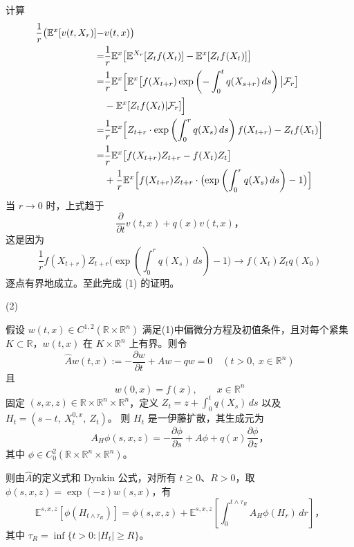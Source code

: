 \documentclass[UTF8，12pt]{ctexart}
\numberwithin{equation}{section}
\begin{document}
计算
\[
\begin{aligned}
	\frac{1}{r} \bigl( \mathbb{E}^x[v(t, X_r)] -& v(t, x) \bigr) \\
	=& \frac{1}{r} \mathbb{E}^x \bigl[ \mathbb{E}^{X_r}[Z_t f(X_t)] - \mathbb{E}^x[Z_t f(X_t)] \bigr]\\
													   =& \frac{1}{r} \mathbb{E}^x \Bigl[ \mathbb{E}^x \bigl[ f(X_{t+r}) \exp\left( -\int_0^t q(X_{s+r})\, ds \right) \big|\mathcal{F}_r \bigr]\\ 
													   &- \mathbb{E}^x[Z_t f(X_t)|\mathcal{F}_r] \Bigr]\\
													   =& \frac{1}{r} \mathbb{E}^x \Bigl[ Z_{t+r} \cdot \exp\left( \int_0^r q(X_s)\, ds \right) f(X_{t+r}) - Z_t f(X_t) \Bigr]\\
													   =&\frac{1}{r} \mathbb{E}^x \bigl[ f(X_{t+r}) Z_{t+r} - f(X_t) Z_t \bigr]\\
													   &+ \frac{1}{r} \mathbb{E}^x \Bigl[ f(X_{t+r}) Z_{t+r} \cdot \bigl( \exp\left( \int_0^r q(X_s)\, ds \right) - 1 \bigr) \Bigr]\\			   
\end{aligned}
\]
当 \( r \to 0 \) 时，上式趋于
\[
\frac{\partial}{\partial t} v(t, x) + q(x) v(t, x)，
\]
这是因为
\[
\frac{1}{r} f(X_{t+r}) Z_{t+r} \bigl( \exp\left( \int_0^r q(X_s)\, ds \right) - 1 \bigr) 
\to f(X_t) Z_t q(X_0)
\]
逐点有界地成立。至此完成 (1) 的证明。

\vspace{1.5em}   %

\noindent(2)

假设 \( w(t, x) \in C^{1,2}(\mathbb{R} \times \mathbb{R}^n) \) 满足(1)中偏微分方程及初值条件，且对每个紧集 \( K \subset \mathbb{R} \)，\( w(t, x) \) 在 \( K \times \mathbb{R}^n \) 上有界。则令
\[
\widehat{A} w(t, x) := -\frac{\partial w}{\partial t} + A w - q w = 0 \quad (t > 0,\ x \in \mathbb{R}^n)
\]
且
\[
w(0, x) = f(x),\qquad x \in \mathbb{R}^n
\]
固定 \( (s, x, z) \in \mathbb{R} \times \mathbb{R}^n \times \mathbb{R}^n \)，定义  
\( Z_t = z + \int_0^t q(X_s)\, ds \) 以及 \( H_t = (s - t,\ X_t^{0,x},\ Z_t) \)。  
则 \( H_t \) 是一伊藤扩散，其生成元为
\[
A_H \phi(s, x, z) = -\frac{\partial \phi}{\partial s} + A\phi + q(x) \frac{\partial \phi}{\partial z}，
\]
其中 \( \phi \in C_0^2(\mathbb{R} \times \mathbb{R}^n \times \mathbb{R}^n) \)。

则由$\widehat{A}$的定义式和 Dynkin 公式，对所有 \( t \geq 0 \)、\( R > 0 \)，取 \( \phi(s, x, z) = \exp(-z) w(s, x) \)，有
\[
\mathbb{E}^{s,x,z} [\phi(H_{t \wedge \tau_R})] = \phi(s, x, z) + \mathbb{E}^{s,x,z} \left[ \int_0^{t \wedge \tau_R} A_H \phi(H_r)\, dr \right]，
\]
其中 \( \tau_R = \inf\{ t > 0 : |H_t| \geq R \} \)。
\end{document}
